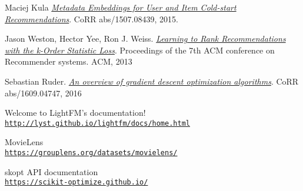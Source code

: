 \begin{thebibliography}{9}
	\hypertarget{maciejlightfm}{} 
	Maciej Kula
	\textit{\href{https://arxiv.org/pdf/1507.08439.pdf}{Metadata Embeddings for User and Item Cold-start Recommendations}}.
	CoRR abs/1507.08439, 2015.
	
	\hypertarget{jasonkos}{} 
	Jason Weston, Hector Yee, Ron J. Weiss.
	\textit{\href{https://static.googleusercontent.com/media/research.google.com/ro//pubs/archive/41534.pdf}{Learning to Rank Recommendations
with the k-Order Statistic Loss}}.
	Proceedings of the 7th ACM conference on Recommender systems. ACM, 2013
	
	\hypertarget{ruder2016}{} 
	Sebastian Ruder.
	\textit{\href{http://arxiv.org/abs/1609.04747}{An overview of gradient descent optimization algorithms}}.
	CoRR abs/1609.04747, 2016
	
	\hypertarget{lightfm}{} 
	Welcome to LightFM’s documentation!
	\\\texttt{\url{http://lyst.github.io/lightfm/docs/home.html}}
	
	\hypertarget{movielens}{} 
	MovieLens
	\\\texttt{\url{https://grouplens.org/datasets/movielens/}}
	
	\hypertarget{skopt}{} 
	skopt API documentation
	\\\texttt{\url{https://scikit-optimize.github.io/}}
\end{thebibliography}
